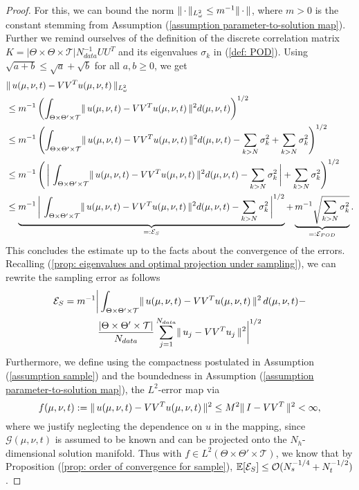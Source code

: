 \begin{proof}
    For this, we can bound the norm $\lVert \,  \cdot  \, \rVert_{L^2_\omega} \leq m^{-1} \lVert \,  \cdot  \, \rVert$, where $m > 0$ is the constant stemming from Assumption (\ref{assumption parameter-to-solution map}). Further we remind ourselves of the definition of the discrete correlation matrix $K = \vert \Theta \times \Theta \times \mathcal{T} \vert N_{data}^{-1} U U^T$ and its eigenvalues $\sigma_k$ in (\ref{def: POD}). Using $\sqrt{a + b} \leq \sqrt{a} + \sqrt{b}$ for all $a,b \geq 0$, we get
    \begin{align*}
        &\lVert \, u(\mu, \nu, t) - V V^T u(\mu, \nu, t) \, \rVert_{L^2_\omega} \\
        &\leq m^{-1} \left( \int_{\Theta \times \Theta' \times \mathcal{T}} \lVert \, u(\mu, \nu, t) - V V^T u(\mu, \nu, t) \, \rVert^2 d(\mu, \nu, t) \right)^{1/2} \\
        &\leq m^{-1} \left( \int_{\Theta \times \Theta' \times \mathcal{T}} \lVert \, u(\mu, \nu, t) - V V^T u(\mu, \nu, t) \, \rVert^2 d(\mu, \nu, t) - \sum_{k > N} \sigma_k^2  + \sum_{k > N} \sigma_k^2 \right)^{1/2} \\
        &\leq m^{-1} \left( \, \bigg\vert \, \int_{\Theta \times \Theta' \times \mathcal{T}} \lVert \, u(\mu, \nu, t) - V V^T u(\mu, \nu, t) \, \rVert^2 d(\mu, \nu, t) - \sum_{k > N} \sigma_k^2 \, \bigg\vert + \sum_{k > N} \sigma_k^2 \right)^{1/2} \\
        &\leq \underbrace{m^{-1} \, \bigg\vert \, \int_{\Theta \times \Theta' \times \mathcal{T}} \lVert \, u(\mu, \nu, t) - V V^T u(\mu, \nu, t) \, \rVert^2 d(\mu, \nu, t) - \sum_{k > N} \sigma_k^2 \, \bigg\vert^{1/2}}_{=: \mathcal{E}_S} + \underbrace{m^{-1} \sqrt{\sum_{k > N} \sigma_k^2}}_{=: \mathcal{E}_{POD}}. \\
    \end{align*}
    This concludes the estimate up to the facts about the convergence of the errors. Recalling (\ref{prop: eigenvalues and optimal projection under sampling}), we can rewrite the sampling error as follows
    \begin{multline*}
        \mathcal{E}_S = m^{-1} 
        \bigg| \int_{\Theta \times \Theta' \times \mathcal{T}} 
        \lVert \, u(\mu, \nu, t) - V V^T u(\mu, \nu, t) \, \rVert^2 \, d(\mu, \nu, t) - \\
        \frac{|\Theta \times \Theta' \times \mathcal{T}|}{N_{data}} 
        \sum_{j=1}^{N_{data}} \lVert \, u_j - V V^T u_j \, \rVert^2 \bigg|^{1/2}
    \end{multline*}
    Furthermore, we define using the compactness postulated in Assumption (\ref{assumption sample}) and the boundedness in Assumption (\ref{assumption parameter-to-solution map}), the $L^2$-error map via
    \begin{equation*}
        f(\mu, \nu, t) := \lVert \, u(\mu, \nu, t) - V V^T u(\mu, \nu, t) \, \rVert^2 \leq M^2 \lVert \, I - V V^T \, \rVert^2 < \infty,
    \end{equation*}
    where we justify neglecting the dependence on $u$ in the mapping, since $\mathcal{G}(\mu, \nu, t)$ is assumed to be known and can be projected onto the $N_h$-dimensional solution manifold. Thus with $f \in L^2(\Theta \times \Theta' \times \mathcal{T})$, we know that by Proposition (\ref{prop: order of convergence for sample}), $\mathbb{E}[\mathcal{E}_S] \leq \mathcal{O}(N_s^{-1/4} + N_t^{-1/2})$.
    

\end{proof}
